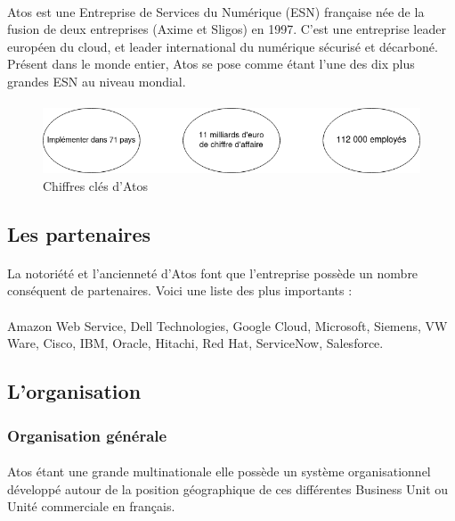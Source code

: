 \documentclass[12pt]{article}
\begin{document}
\begin {sloppypar}
\paragraph{}
Atos est une Entreprise de Services du Numérique (ESN) française née de la fusion de 
deux entreprises (Axime et Sligos) en 1997. C’est une entreprise leader européen du cloud, 
et leader international du numérique sécurisé et décarboné. Présent dans 
le monde entier, Atos se pose comme étant l’une des dix plus grandes ESN au niveau mondial.

\paragraph{}
\begin{figure}[h]
  \includegraphics[width=\textwidth] {chiffres-cles.png}
  \caption {Chiffres clés d'Atos}
\end{figure}

\subsection{Les partenaires}
\paragraph{}
La notoriété et l'ancienneté d'Atos font que l'entreprise possède un nombre conséquent 
de partenaires. Voici une liste des plus importants : 
\paragraph{}
Amazon Web Service, Dell Technologies, Google Cloud, Microsoft, Siemens, VW Ware, Cisco, IBM, Oracle,
Hitachi, Red Hat, ServiceNow, Salesforce.

\subsection{L'organisation}
\subsubsection{Organisation générale}
\paragraph{}
Atos étant une grande multinationale elle possède un système organisationnel développé 
autour de la position géographique de ces différentes Business Unit ou Unité commerciale
en français. 


\end{sloppypar}
\end{document}

